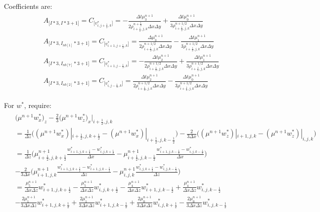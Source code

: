 \documentclass{article}
\numberwithin{equation}{subsection}
\begin{document}
Coefficients are:
\begin{align}
\begin{split}
& A_{\Big[I*3,I*3+1\Big]} = C_{\Big[v^*_{i,j+\frac{1}{2},k}\Big]} = -\frac{\Delta t \mu^{n+1}_3}{2\rho^{n+\frac{1}{2}}_{i+\frac{1}{2},j,k} \Delta x \Delta y} + \frac{\Delta t \mu^{n+1}_0}{3\rho^{n+1/2}_{i+\frac{1}{2},j,k} \Delta x \Delta y} \\
& A_{\Big[I*3,I_{nb[1]}*3+1\Big]} = C_{\Big[v^*_{i+1,j+\frac{1}{2},k}\Big]} = \frac{\Delta \mu^{n+1}_3}{2 \rho^{n+1/2}_{i+\frac{1}{2},j,k} \Delta x \Delta y} - \frac{\Delta t \mu^{n+1}_1}{3 \rho^{n+1/2}_{i+\frac{1}{2},j,k} \Delta x \Delta y} \\
& A_{\Big[I*3,I_{nb[7]}*3+1\Big]} = C_{\Big[v^*_{i+1,j-\frac{1}{2},k}\Big]} = -\frac{\Delta t \mu^{n+1}_2}{2 \rho^{n+1/2}_{i+\frac{1}{2},j,k} \Delta x \Delta y} + \frac{\Delta t \mu^{n+1}_1}{3 \rho^{n+1/2}_{i+\frac{1}{2},j,k} \Delta x \Delta y} \\
& A_{\Big[I*3,I_{nb[2]}*3+1\Big]} = C_{\Big[v^*_{i,j-\frac{1}{2},k}\Big]} = \frac{\Delta t \mu^{n+1}_2}{2 \rho^{n+1/2}_{i+\frac{1}{2},j,k} \Delta x \Delta y} - \frac{\Delta t \mu^{n+1}_0}{3 \rho^{n+1/2}_{i+\frac{1}{2},j,k} \Delta x \Delta y}
\end{split}
\end{align}

For $w^*$, require:
\begin{align}
\begin{split}
& \Big( \mu^{n+1}w^*_x \Big)_z -\frac{2}{3} \Big( \mu^{n+1}w^*_z\Big)_x |_{i+\frac{1}{2},j,k}\\
& = \frac{1}{\Delta z} \Big((\mu^{n+1}w^*_x)|_{i+\frac{1}{2},j,k+\frac{1}{2}} - (\mu^{n+1}w^*_x)|_{i+\frac{1}{2},j,k-\frac{1}{2}}\Big)  -\frac{2}{3\Delta x}\Big( (\mu^{n+1}w^*_z)|_{i+1,j,k} - (\mu^{n+1}w^*_z)|_{i,j,k} \Big) \\
& = \frac{1}{\Delta z}\Big( \mu^{n+1}_{i+\frac{1}{2},j,k+\frac{1}{2}}\frac{w^*_{i+1,j,k+\frac{1}{2}} - w^*_{i,j,k+\frac{1}{2}}}{\Delta x}-\mu^{n+1}_{i+\frac{1}{2},j,k-\frac{1}{2}}\frac{w^*_{i+1,j,k-\frac{1}{2}} - w^*_{i,j,k-\frac{1}{2}}}{\Delta x} \Big) \\
& -\frac{2}{3\Delta x}\Big(\mu^{n+1}_{i+1,j,k}\frac{w^*_{i+1,j,k+\frac{1}{2}}- w^*_{i+1,j,k-\frac{1}{2}}}{\Delta z} - \mu^{n+1}_{i,j,k} \frac{w^*_{i,j,k+\frac{1}{2}}-w^*_{i,j,k-\frac{1}{2}}}{\Delta z}\Big) \\
& = \frac{\mu^{n+1}_5}{\Delta x \Delta z}w^*_{i+1,j,k+\frac{1}{2}} - \frac{\mu^{n+1}_5}{\Delta x \Delta z}w^*_{i,j,k+\frac{1}{2}} -\frac{\mu^{n+1}_4}{\Delta x \Delta z}w^*_{i+1,j,k-\frac{1}{2}} + \frac{\mu^{n+1}_4}{\Delta x \Delta z}w^*_{i,j,k-\frac{1}{2}}\\
& -\frac{2\mu^{n+1}_1}{3\Delta x \Delta z}w^*_{i+1,j,k+\frac{1}{2}} + \frac{2\mu^{n+1}_1}{3\Delta x \Delta z}w^*_{i+1,j,k-\frac{1}{2}} + \frac{2\mu^{n+1}_0}{3\Delta x \Delta z}w^*_{i,j,k+\frac{1}{2}} - \frac{2\mu^{n+1}_0}{3\Delta x \Delta z}w^*_{i,j,k-\frac{1}{2}}
\end{split}
\end{align}
\end{document}
